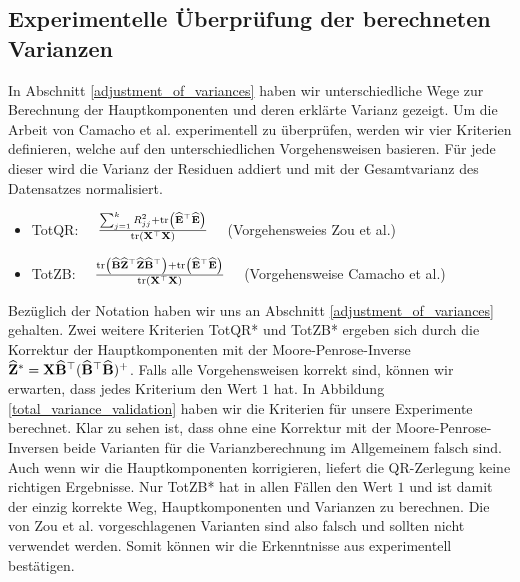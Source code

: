 \subsection{Experimentelle Überprüfung der berechneten Varianzen}

In Abschnitt \ref{adjustment_of_variances} haben wir unterschiedliche Wege zur Berechnung der Hauptkomponenten und deren erklärte Varianz gezeigt. Um die Arbeit von Camacho et al. \cite{camacho} experimentell zu überprüfen, werden wir vier Kriterien definieren, welche auf den unterschiedlichen Vorgehensweisen basieren. Für jede dieser wird die Varianz der Residuen addiert und mit der Gesamtvarianz des Datensatzes normalisiert.
\begin{itemize}
\item TotQR: $\quad \frac{\sum_{j=1}^k R_{jj}^2 + \text{tr} \left( \widehat{\mathbf{E}}^{\top}\widehat{\mathbf{E}} \right)}{\text{tr} \left( \mathbf{X}^{\top}\mathbf{X} \right)} \quad$ (Vorgehensweies Zou et al.)
\item TotZB: $\quad \frac{\text{tr} \left( \widehat{\mathbf{B}} \widehat{\mathbf{Z}}^{\top} \widehat{\mathbf{Z}} \widehat{\mathbf{B}}^{\top} \right) + \text{tr} \left( \widehat{\mathbf{E}}^{\top}\widehat{\mathbf{E}} \right)}{\text{tr} \left( \mathbf{X}^{\top}\mathbf{X} \right)} \quad$ (Vorgehensweise Camacho et al.)
\end{itemize}
Bezüglich der Notation haben wir uns an Abschnitt \ref{adjustment_of_variances} gehalten. Zwei weitere Kriterien TotQR* und TotZB* ergeben sich durch die Korrektur der Hauptkomponenten mit der Moore-Penrose-Inverse $\widehat{\mathbf{Z}}^* = \mathbf{X} \widehat{\mathbf{B}}^{\top} (\widehat{\mathbf{B}}^{\top}\widehat{\mathbf{B}})^+$. Falls alle Vorgehensweisen korrekt sind, können wir erwarten, dass jedes Kriterium den Wert $1$ hat. In Abbildung \ref{total_variance_validation} haben wir die Kriterien für unsere Experimente berechnet. Klar zu sehen ist, dass ohne eine Korrektur mit der Moore-Penrose-Inversen beide Varianten für die Varianzberechnung im Allgemeinem falsch sind. Auch wenn wir die Hauptkomponenten korrigieren, liefert die QR-Zerlegung keine richtigen Ergebnisse. Nur TotZB* hat in allen Fällen den Wert $1$ und ist damit der einzig korrekte Weg, Hauptkomponenten und Varianzen zu berechnen. Die von Zou et al. \cite{zou_sparsepca} vorgeschlagenen Varianten sind also falsch und sollten nicht verwendet werden. Somit können wir die Erkenntnisse aus \cite{camacho} experimentell bestätigen.

